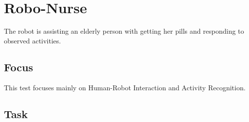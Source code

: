\newpage
\section{Robo-Nurse}

The robot is assisting an elderly person with getting her pills and responding to observed activities.

\subsection{Focus}

This test focuses mainly on Human-Robot Interaction and Activity Recognition.

\subsection{Task}
